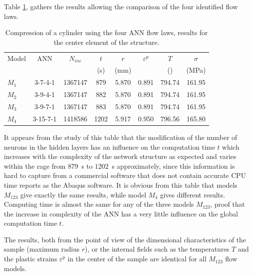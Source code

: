 \documentclass[algorithms,article,submit,pdftex,moreauthors]{Definitions/mdpi}
\begin{document}
Table \ref{tab:SimuResults}, gathers the results allowing the comparison of the four identified flow laws.
\begin{table}[h!]
\centering
\caption{Compression of a cylinder using the four ANN flow laws, results for the center element of the structure.}
\begin{tabular}{lccccccc}
	\hline
	Model &   ANN    & $N_{inc}$ & $t$  &  $r$  & $\varepsilon^p$ &    $T$     & $\sigma$ \\
	      &          &           & (s)  & (mm)  &                 & (\celsius) &  (MPa)   \\ \hline
	$M_1$ & 3-7-4-1  &  1367147  & 879  & 5.870 &      0.891      &   794.74   &  161.95  \\
	$M_2$ & 3-9-4-1  &  1367147  & 882  & 5.870 &      0.891      &   794.74   &  161.95  \\
	$M_3$ & 3-9-7-1  &  1367147  & 883  & 5.870 &      0.891      &   794.74   &  161.95  \\
	$M_4$ & 3-15-7-1 &  1418586  & 1202 & 5.917 &      0.950      &   796.56   &  165.80  \\ \hline
\end{tabular}
\label{tab:SimuResults}
\end{table}
It appears from the study of this table that the modification of the number of neurons in the hidden layers has an influence on the computation time $t$ which increases with the complexity of the network structure as expected and varies within the rage from $879$~s to $1202$~s approximately, since this information is hard to capture from a commercial software that does not contain accurate CPU time reports as the Abaqus software.
It is obvious from this table that models $M_{123}$ give exactly the same results, while model $M_4$ gives different results.
Computing time is almost the same for any of the three models $M_{123}$, proof that the increase in complexity of the ANN has a very little influence on the global computation time $t$.

The results, both from the point of view of the dimensional characteristics of the sample (maximum radius $r$), or the internal fields such as the temperatures $T$ and the plastic strains $\varepsilon^p$ in the center of the sample are identical for all $M_{123}$ flow models.
\end{document}
